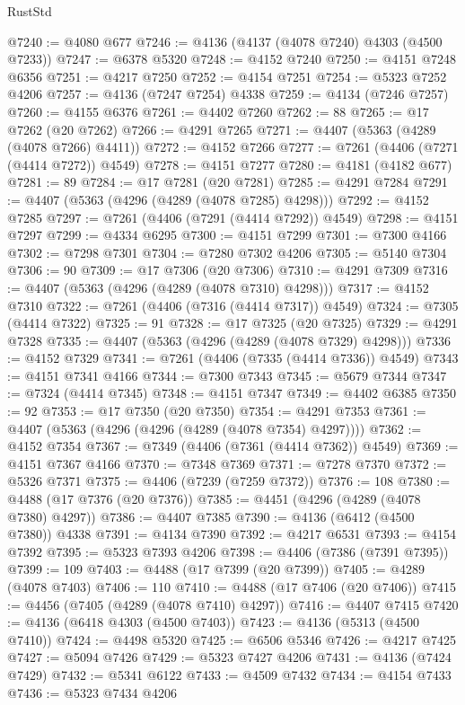 \begin{lexlean}{RustStd}
\begin{coremodule}
{\begin{coremodule}
{{{{{{{{{{{{{{{{{{{{{{{{{{{{{{{{{{{{{{{{{{{{{{{{{{@7240 := @4080 @677
@7246 := @4136 (@4137 (@4078 @7240) @4303 (@4500 @7233))
@7247 := @6378 @5320
@7248 := @4152 @7240
@7250 := @4151 @7248 @6356
@7251 := @4217 @7250
@7252 := @4154 @7251
@7254 := @5323 @7252 @4206
@7257 := @4136 (@7247 @7254) @4338
@7259 := @4134 (@7246 @7257)
@7260 := @4155 @6376
@7261 := @4402 @7260
@7262 := 88
@7265 := @17 @7262 (@20 @7262)
@7266 := @4291 @7265
@7271 := @4407 (@5363 (@4289 (@4078 @7266) @4411))
@7272 := @4152 @7266
@7277 := @7261 (@4406 (@7271 (@4414 @7272)) @4549)
@7278 := @4151 @7277
@7280 := @4181 (@4182 @677)
@7281 := 89
@7284 := @17 @7281 (@20 @7281)
@7285 := @4291 @7284
@7291 := @4407 (@5363 (@4296 (@4289 (@4078 @7285) @4298)))
@7292 := @4152 @7285
@7297 := @7261 (@4406 (@7291 (@4414 @7292)) @4549)
@7298 := @4151 @7297
@7299 := @4334 @6295
@7300 := @4151 @7299
@7301 := @7300 @4166
@7302 := @7298 @7301
@7304 := @7280 @7302 @4206
@7305 := @5140 @7304
@7306 := 90
@7309 := @17 @7306 (@20 @7306)
@7310 := @4291 @7309
@7316 := @4407 (@5363 (@4296 (@4289 (@4078 @7310) @4298)))
@7317 := @4152 @7310
@7322 := @7261 (@4406 (@7316 (@4414 @7317)) @4549)
@7324 := @7305 (@4414 @7322)
@7325 := 91
@7328 := @17 @7325 (@20 @7325)
@7329 := @4291 @7328
@7335 := @4407 (@5363 (@4296 (@4289 (@4078 @7329) @4298)))
@7336 := @4152 @7329
@7341 := @7261 (@4406 (@7335 (@4414 @7336)) @4549)
@7343 := @4151 @7341 @4166
@7344 := @7300 @7343
@7345 := @5679 @7344
@7347 := @7324 (@4414 @7345)
@7348 := @4151 @7347
@7349 := @4402 @6385
@7350 := 92
@7353 := @17 @7350 (@20 @7350)
@7354 := @4291 @7353
@7361 := @4407 (@5363 (@4296 (@4296 (@4289 (@4078 @7354) @4297))))
@7362 := @4152 @7354
@7367 := @7349 (@4406 (@7361 (@4414 @7362)) @4549)
@7369 := @4151 @7367 @4166
@7370 := @7348 @7369
@7371 := @7278 @7370
@7372 := @5326 @7371
@7375 := @4406 (@7239 (@7259 @7372))
@7376 := 108
@7380 := @4488 (@17 @7376 (@20 @7376))
@7385 := @4451 (@4296 (@4289 (@4078 @7380) @4297))
@7386 := @4407 @7385
@7390 := @4136 (@6412 (@4500 @7380)) @4338
@7391 := @4134 @7390
@7392 := @4217 @6531
@7393 := @4154 @7392
@7395 := @5323 @7393 @4206
@7398 := @4406 (@7386 (@7391 @7395))
@7399 := 109
@7403 := @4488 (@17 @7399 (@20 @7399))
@7405 := @4289 (@4078 @7403)
@7406 := 110
@7410 := @4488 (@17 @7406 (@20 @7406))
@7415 := @4456 (@7405 (@4289 (@4078 @7410) @4297))
@7416 := @4407 @7415
@7420 := @4136 (@6418 @4303 (@4500 @7403))
@7423 := @4136 (@5313 (@4500 @7410))
@7424 := @4498 @5320
@7425 := @6506 @5346
@7426 := @4217 @7425
@7427 := @5094 @7426
@7429 := @5323 @7427 @4206
@7431 := @4136 (@7424 @7429)
@7432 := @5341 @6122
@7433 := @4509 @7432
@7434 := @4154 @7433
@7436 := @5323 @7434 @4206
}}}}}}}}}}}}}}}}}}}}}}}}}}}}}}}}}}}}}}}}}}}}}}}}}}
\end{coremodule}}
\end{coremodule}
\end{lexlean}
